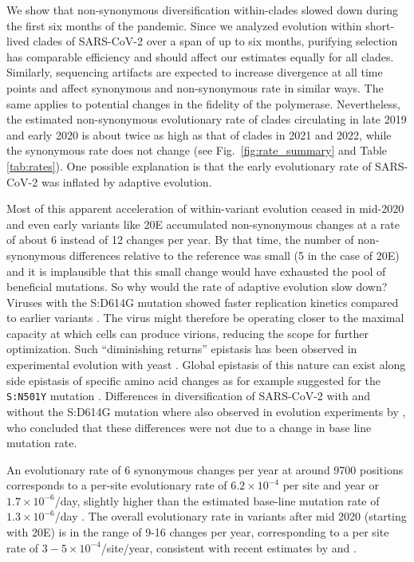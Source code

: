 \documentclass[aps,rmp, twocolumn]{revtex4}
\begin{document}
We show that non-synonymous diversification within-clades slowed down during the first six months of the pandemic.
Since we analyzed evolution within short-lived clades of SARS-CoV-2 over a span of up to six months, purifying selection has comparable efficiency and should affect our estimates equally for all clades.
Similarly, sequencing artifacts are expected to increase divergence at all time points and affect synonymous and non-synonymous rate in similar ways.
The same applies to potential changes in the fidelity of the polymerase.
Nevertheless, the estimated non-synonymous evolutionary rate of clades circulating in late 2019 and early 2020 is about twice as high as that of clades in 2021 and 2022, while the synonymous rate does not change (see Fig.~\ref{fig:rate_summary} and Table \ref{tab:rates}).
One possible explanation is that the early evolutionary rate of SARS-CoV-2 was inflated by adaptive evolution.

Most of this apparent acceleration of within-variant evolution ceased in mid-2020 and even early variants like 20E accumulated non-synonymous changes at a rate of about 6 instead of 12 changes per year.
By that time, the number of non-synonymous differences relative to the reference was small (5 in the case of 20E) and it is implausible that this small change would have exhausted the pool of beneficial mutations.
So why would the rate of adaptive evolution slow down?
Viruses with the S:D614G mutation showed faster replication kinetics compared to earlier variants \citep{korber_tracking_2020}.
The virus might therefore be operating closer to the maximal capacity at which cells can produce virions, reducing the scope for further optimization.
Such ``diminishing returns'' epistasis has been observed in experimental evolution with yeast \citep{kryazhimskiy_global_2014}.
Global epistasis of this nature can exist along side epistasis of specific amino acid changes as for example suggested for the \texttt{S:N501Y} mutation \citep{martin_emergence_2021}.
Differences in diversification of SARS-CoV-2 with and without the S:D614G mutation where also observed in evolution experiments by \citet{amicone_mutation_2022}, who concluded that these differences were not due to a change in base line mutation rate.

An evolutionary rate of 6 synonymous changes per year at around 9700 positions corresponds to a per-site evolutionary rate of $6.2\times 10^{-4}$ per site and year or $1.7\times 10^{-6}$/day, slightly higher than the estimated base-line mutation rate of $1.3\times 10^{-6}$/day \citep{amicone_mutation_2022}.
The overall evolutionary rate in variants after mid 2020 (starting with 20E) is in the range of 9-16 changes per year, corresponding to a per site rate of $3 - 5\times 10^{-4}$/site/year, consistent with recent estimates by \citet{hill_origins_2022} and \citet{tay_emergence_2022}.
\end{document}
